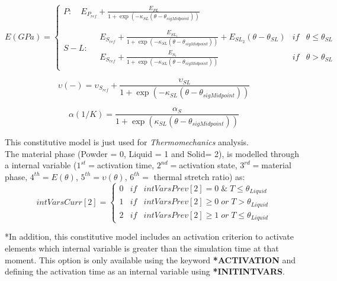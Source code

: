 \documentclass[oneside,11pt,times]{book}
\begin{document}
\begin{enumerate}
   \begin{equation*}
    E (GPa)=\left\{ \begin{array}{lcc}
    P:\quad E_{P_{ref}} + \frac{E_{PL}}{1 +\exp(-\kappa_{SL} (\theta -\theta_{sigMidpoint}))} \\ \\ S-L: \quad \begin{array}{lcc}
    E_{S_{ref}}  + \frac{E_{SL_1} }{1 +\exp(-\kappa_{SL} (\theta -\theta_{sigMidpoint}))} + E_{SL_2}  (\theta - \theta_{SL}) & if & \theta \leq \theta_{SL}\\
    E_{S_{ref}} +  \frac{E_{S_1}}{1 +\exp(-\kappa_{SL} (\theta -\theta_{sigMidpoint}))}& if & \theta> \theta_{SL}
    \end{array}
    \end{array}
    \right.
    \end{equation*}
    
    \begin{equation*}
    \upsilon (-)=
     \upsilon_{S_{ref}} + \frac{\upsilon_{SL}}{1 +\exp(-\kappa_{SL} (\theta -\theta_{sigMidpoint}))}
    \end{equation*}
    
    \begin{equation*}
    \alpha (1/K)= \frac{\alpha_{S}}{1 +\exp(\kappa_{SL} (\theta -\theta_{sigMidpoint}))}
    \end{equation*}


This constitutive model is just used for \textit{Thermomechanics} analysis.
\\The material phase (Powder = 0, Liquid = 1 and Solid= 2), is modelled through a internal variable ($1^{st}=$activation time, $2^{nd}=$activation state, $3^{rd}=$material phase, $4^{th}=E(\theta)$, $5^{th}=\upsilon(\theta)$, $6^{th}=$ thermal stretch ratio) as:
\begin{equation*}
    intVarsCurr[2]=\left\{ \begin{array}{lcc}
    0  & if & intVarsPrev[2]=0 \; \& \; T\leq \theta_{Liquid}\\
    1 & if & intVarsPrev[2]\geq0 \; or \; T> \theta_{Liquid}\\
    2 & if & intVarsPrev[2]\geq1 \; or \; T\leq \theta_{Liquid}
    \end{array}
    \right.
    \end{equation*}

 *In addition, this constitutive model includes an activation criterion to activate elements which internal variable is greater than the simulation time at that moment. This option is only available using the keyword  \textbf{*ACTIVATION} and defining the activation time as an internal variable using \textbf{*INITINTVARS}.


\end{enumerate}
\end{document}
